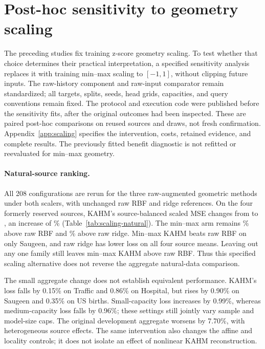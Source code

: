 \section{Post-hoc sensitivity to geometry scaling}\label{sec:scaling}
The preceding studies fix training z-score geometry scaling. To test whether
that choice determines their practical interpretation, a specified sensitivity analysis
replaces it with training min--max scaling to $[-1,1]$, without clipping future
inputs. The raw-history component and raw-input comparator remain standardized; all targets, splits,
seeds, head grids, capacities, and query conventions remain fixed. The protocol
and execution code were published before the sensitivity fits, after the
original outcomes had been inspected. These are paired post-hoc comparisons
on reused sources and draws, not fresh confirmation. Appendix~\ref{app:scaling}
specifies the intervention, costs, retained evidence, and complete results.
The previously fitted benefit diagnostic is not refitted or reevaluated for min--max
geometry.

\paragraph{Natural-source ranking.}
All 208 configurations are rerun for the three raw-augmented geometric
methods under both scalers, with unchanged raw RBF and ridge references.
On the four formerly reserved sources, KAHM's source-balanced scaled MSE
changes from \ScalingNaturalKahmStandardLoss{} to
\ScalingNaturalKahmMinmaxLoss{}, an increase of
\ScalingNaturalKahmChangePercent\% (Table~\ref{tab:scaling-natural}).
The min--max arm remains \ScalingNaturalKahmVsRawPercent\% above raw RBF
and \ScalingNaturalKahmVsRidgePercent\% above raw ridge. Min--max KAHM
beats raw RBF on only Saugeen, and raw ridge has lower loss on all four
source means. Leaving out any one family still leaves min--max KAHM
above raw RBF. Thus this specified scaling alternative does not reverse
the aggregate natural-data comparison.



The small aggregate change does not establish equivalent performance. KAHM's loss
falls by 0.15\% on Traffic and 0.86\% on Hospital, but rises by 0.90\% on
Saugeen and 0.35\% on US births. Small-capacity loss increases by 0.99\%,
whereas medium-capacity loss falls by 0.96\%; these settings still jointly
vary sample and model-size caps. The original development aggregate worsens
by 7.70\%, with heterogeneous source effects. The same intervention also
changes the affine and locality controls; it does not isolate an effect
of nonlinear KAHM reconstruction.

